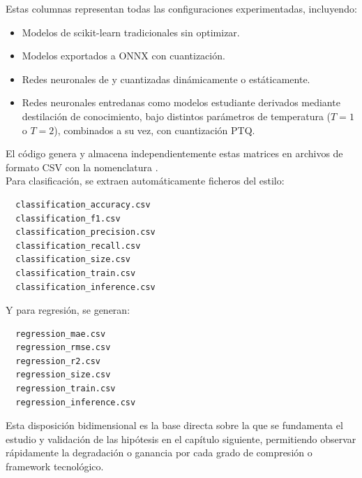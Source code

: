 \documentclass[a4paper,12pt,twoside,final]{book}
\begin{document}
Estas columnas representan todas las configuraciones experimentadas, incluyendo:
\begin{itemize}
  \item Modelos de scikit-learn tradicionales sin optimizar.
  \item Modelos exportados a ONNX con cuantización.
  \item Redes neuronales de  y  cuantizadas dinámicamente o estáticamente.
  \item Redes neuronales entredanas como modelos estudiante derivados mediante destilación de conocimiento, bajo
  distintos parámetros de temperatura ($T=1$ o $T=2$), combinados a su vez, con cuantización PTQ.
\end{itemize}

El código genera y almacena independientemente estas matrices en archivos de formato CSV con la nomenclatura
.\\

Para clasificación, se extraen automáticamente ficheros del estilo:
\begin{verbatim}
  classification_accuracy.csv
  classification_f1.csv
  classification_precision.csv
  classification_recall.csv
  classification_size.csv
  classification_train.csv
  classification_inference.csv
\end{verbatim}

Y para regresión, se generan:
\begin{verbatim}
  regression_mae.csv
  regression_rmse.csv
  regression_r2.csv
  regression_size.csv
  regression_train.csv
  regression_inference.csv
\end{verbatim}

Esta disposición bidimensional es la base directa sobre la que se fundamenta el estudio y validación de las hipótesis en
el capítulo siguiente, permitiendo observar rápidamente la degradación o ganancia por cada grado de compresión o
framework tecnológico.
\end{document}
